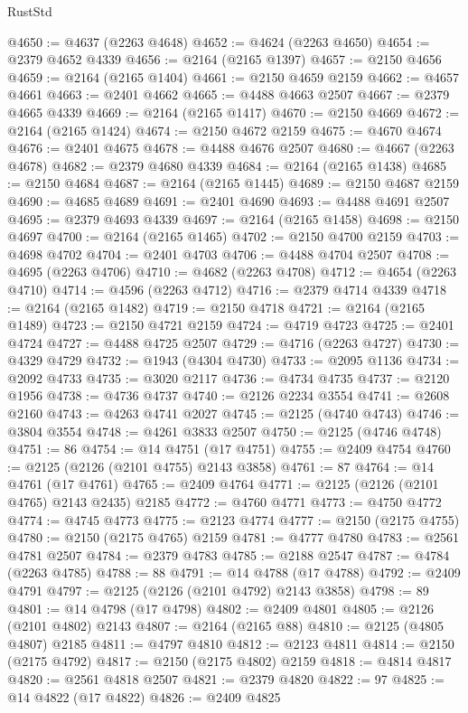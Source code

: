 \begin{lexlean}{RustStd}
\begin{coremodule}
@4650 := @4637 (@2263 @4648)
@4652 := @4624 (@2263 @4650)
@4654 := @2379 @4652 @4339
@4656 := @2164 (@2165 @1397)
@4657 := @2150 @4656
@4659 := @2164 (@2165 @1404)
@4661 := @2150 @4659 @2159
@4662 := @4657 @4661
@4663 := @2401 @4662
@4665 := @4488 @4663 @2507
@4667 := @2379 @4665 @4339
@4669 := @2164 (@2165 @1417)
@4670 := @2150 @4669
@4672 := @2164 (@2165 @1424)
@4674 := @2150 @4672 @2159
@4675 := @4670 @4674
@4676 := @2401 @4675
@4678 := @4488 @4676 @2507
@4680 := @4667 (@2263 @4678)
@4682 := @2379 @4680 @4339
@4684 := @2164 (@2165 @1438)
@4685 := @2150 @4684
@4687 := @2164 (@2165 @1445)
@4689 := @2150 @4687 @2159
@4690 := @4685 @4689
@4691 := @2401 @4690
@4693 := @4488 @4691 @2507
@4695 := @2379 @4693 @4339
@4697 := @2164 (@2165 @1458)
@4698 := @2150 @4697
@4700 := @2164 (@2165 @1465)
@4702 := @2150 @4700 @2159
@4703 := @4698 @4702
@4704 := @2401 @4703
@4706 := @4488 @4704 @2507
@4708 := @4695 (@2263 @4706)
@4710 := @4682 (@2263 @4708)
@4712 := @4654 (@2263 @4710)
@4714 := @4596 (@2263 @4712)
@4716 := @2379 @4714 @4339
@4718 := @2164 (@2165 @1482)
@4719 := @2150 @4718
@4721 := @2164 (@2165 @1489)
@4723 := @2150 @4721 @2159
@4724 := @4719 @4723
@4725 := @2401 @4724
@4727 := @4488 @4725 @2507
@4729 := @4716 (@2263 @4727)
@4730 := @4329 @4729
@4732 := @1943 (@4304 @4730)
@4733 := @2095 @1136
@4734 := @2092 @4733
@4735 := @3020 @2117
@4736 := @4734 @4735
@4737 := @2120 @1956
@4738 := @4736 @4737
@4740 := @2126 @2234 @3554
@4741 := @2608 @2160
@4743 := @4263 @4741 @2027
@4745 := @2125 (@4740 @4743)
@4746 := @3804 @3554
@4748 := @4261 @3833 @2507
@4750 := @2125 (@4746 @4748)
@4751 := 86
@4754 := @14 @4751 (@17 @4751)
@4755 := @2409 @4754
@4760 := @2125 (@2126 (@2101 @4755) @2143 @3858)
@4761 := 87
@4764 := @14 @4761 (@17 @4761)
@4765 := @2409 @4764
@4771 := @2125 (@2126 (@2101 @4765) @2143 @2435) @2185
@4772 := @4760 @4771
@4773 := @4750 @4772
@4774 := @4745 @4773
@4775 := @2123 @4774
@4777 := @2150 (@2175 @4755)
@4780 := @2150 (@2175 @4765) @2159
@4781 := @4777 @4780
@4783 := @2561 @4781 @2507
@4784 := @2379 @4783
@4785 := @2188 @2547
@4787 := @4784 (@2263 @4785)
@4788 := 88
@4791 := @14 @4788 (@17 @4788)
@4792 := @2409 @4791
@4797 := @2125 (@2126 (@2101 @4792) @2143 @3858)
@4798 := 89
@4801 := @14 @4798 (@17 @4798)
@4802 := @2409 @4801
@4805 := @2126 (@2101 @4802) @2143
@4807 := @2164 (@2165 @88)
@4810 := @2125 (@4805 @4807) @2185
@4811 := @4797 @4810
@4812 := @2123 @4811
@4814 := @2150 (@2175 @4792)
@4817 := @2150 (@2175 @4802) @2159
@4818 := @4814 @4817
@4820 := @2561 @4818 @2507
@4821 := @2379 @4820
@4822 := 97
@4825 := @14 @4822 (@17 @4822)
@4826 := @2409 @4825

\end{coremodule}
\end{lexlean}
